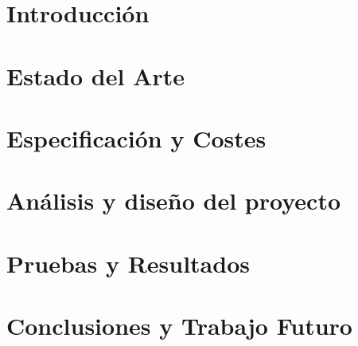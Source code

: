 \documentclass[twoside,english,a4paper,12pt]{plantilla/twcam-tfm-doc}
\begin{document}
\pagestyle{twcam}
\justify
\chapter{Introducción}\label{chapt:intro}

    
\chapter{Estado del Arte}\label{chapt:estado-del-arte}


\chapter{Especificación y Costes}\label{chapt:especificacion}


\chapter{Análisis y diseño del proyecto}\label{chapt:anali-diseño}


\chapter{Pruebas y Resultados}\label{chapt:results}


\chapter{Conclusiones y Trabajo Futuro}\label{chapt:conclusion}


\pagestyle{appendix}
\appendix
 



\label{chapt:biblio}
 
\end{document}
